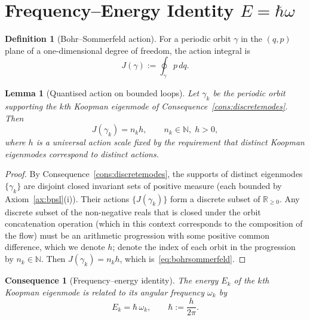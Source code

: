 \documentclass[11pt,twocolumn,a4paper]{article}
\theoremstyle{axiomstyle}
\theoremstyle{conseqstyle}
\newtheorem{consequence}{Consequence}
\newtheorem{lemma}{Lemma}
\theoremstyle{definition}
\newtheorem{definition}{Definition}
\theoremstyle{remark}
\newcommand{\Real}{\mathbb{R}}
\newcommand{\Natural}{\mathbb{N}}
\begin{document}
\section{Frequency--Energy Identity $E=\hbar\omega$}
\label{sec:energyfrequency}

\begin{definition}[Bohr--Sommerfeld action]
\label{def:bsaction}
For a periodic orbit $\gamma$ in the $(q,p)$ plane of a one-dimensional degree of freedom, the action integral is
\begin{equation*}
J(\gamma):=\oint_{\gamma}p\,dq.
\end{equation*}
\end{definition}

\begin{lemma}[Quantised action on bounded loops]
\label{lem:actionquantised}
Let $\gamma_{k}$ be the periodic orbit supporting the $k$th Koopman eigenmode of Consequence~\ref{cons:discretemodes}. Then
\begin{equation}
J(\gamma_{k})=n_{k}h,\qquad n_{k}\in\Natural,\;h>0,
\label{eq:bohrsommerfeld}
\end{equation}
where $h$ is a universal action scale fixed by the requirement that distinct Koopman eigenmodes correspond to distinct actions.
\end{lemma}
\begin{proof}
By Consequence~\ref{cons:discretemodes}, the supports of distinct eigenmodes $\{\gamma_{k}\}$ are disjoint closed invariant sets of positive measure (each bounded by Axiom~\ref{ax:bpsl}(i)). Their actions $\{J(\gamma_{k})\}$ form a discrete subset of $\Real_{\ge 0}$. Any discrete subset of the non-negative reals that is closed under the orbit concatenation operation (which in this context corresponds to the composition of the flow) must be an arithmetic progression with some positive common difference, which we denote $h$; denote the index of each orbit in the progression by $n_{k}\in\Natural$. Then $J(\gamma_{k})=n_{k}h$, which is~\eqref{eq:bohrsommerfeld}.
\end{proof}

\begin{consequence}[Frequency--energy identity]
\label{cons:energyfrequency}
The energy $E_{k}$ of the $k$th Koopman eigenmode is related to its angular frequency $\omega_{k}$ by
\begin{equation}
E_{k}=\hbar\,\omega_{k},\qquad \hbar:=\frac{h}{2\pi}.
\label{eq:ehbaromega}
\end{equation}
\end{consequence}
\end{document}
